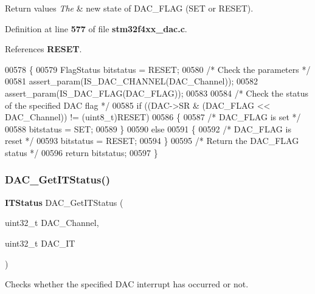 \begin{DoxyRetVals}{Return values}
{\em The} & new state of D\+A\+C\+\_\+\+F\+L\+AG (S\+ET or R\+E\+S\+ET). \\
\hline
\end{DoxyRetVals}


Definition at line \textbf{ 577} of file \textbf{ stm32f4xx\+\_\+dac.\+c}.



References \textbf{ R\+E\+S\+ET}.


\begin{DoxyCode}
00578 \{
00579   FlagStatus bitstatus = RESET;
00580   \textcolor{comment}{/* Check the parameters */}
00581   assert_param(IS_DAC_CHANNEL(DAC\_Channel));
00582   assert_param(IS_DAC_FLAG(DAC\_FLAG));
00583 
00584   \textcolor{comment}{/* Check the status of the specified DAC flag */}
00585   \textcolor{keywordflow}{if} ((DAC->SR & (DAC\_FLAG << DAC\_Channel)) != (uint8\_t)RESET)
00586   \{
00587     \textcolor{comment}{/* DAC\_FLAG is set */}
00588     bitstatus = SET;
00589   \}
00590   \textcolor{keywordflow}{else}
00591   \{
00592     \textcolor{comment}{/* DAC\_FLAG is reset */}
00593     bitstatus = RESET;
00594   \}
00595   \textcolor{comment}{/* Return the DAC\_FLAG status */}
00596   \textcolor{keywordflow}{return}  bitstatus;
00597 \}
\end{DoxyCode}
\mbox{\label{group__DAC__Group3_ga541aac3b50db3a8a806ec5ef30679aca}} 
\subsubsection{D\+A\+C\+\_\+\+Get\+I\+T\+Status()}
{\footnotesize\ttfamily \textbf{ I\+T\+Status} D\+A\+C\+\_\+\+Get\+I\+T\+Status (\begin{DoxyParamCaption}\item[{uint32\+\_\+t}]{D\+A\+C\+\_\+\+Channel,  }\item[{uint32\+\_\+t}]{D\+A\+C\+\_\+\+IT }\end{DoxyParamCaption})}



Checks whether the specified D\+AC interrupt has occurred or not. 


